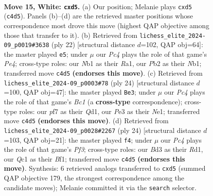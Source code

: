 \documentclass[11pt]{article}
\begin{document}
\clearpage

\begin{figure}[p]\centering
\begin{subfigure}{0.46\textwidth}\centering
\resizebox{\linewidth}{!}{%
\newchessgame
\chessboard[
  setfen={r1bq2k1/p3rppp/4pn2/2pp4/n1P5/3BP1P1/PP3RPP/RNQ1N1K1 w - - 1 15},
  showmover=false,
  pgfstyle=straightmove, color=movearrow, markmove={c4-d5}
]}
\caption{}
\end{subfigure}\hfill
\begin{subfigure}{0.46\textwidth}\centering
\resizebox{\linewidth}{!}{%
\newchessgame
\chessboard[
  setfen={r3kb1r/pp1q1ppp/4pn2/3p4/3PP3/5Q1P/PP3PP1/RNB1R1K1 w kq - 0 12},
  showmover=false,
  pgfstyle=straightmove, color=movearrow, markmove={e4-e5}
]}
\caption{}
\end{subfigure}
\\[4pt]
\begin{subfigure}{0.46\textwidth}\centering
\resizebox{\linewidth}{!}{%
\newchessgame
\chessboard[
  setfen={r3kb1r/pp1q1pp1/2n1p2p/3pP1n1/3P4/2N2P2/PP4PP/R1BQNRK1 w kq - 0 13},
  showmover=false,
  pgfstyle=straightmove, color=movearrow, markmove={c1-e3}
]}
\caption{}
\end{subfigure}\hfill
\begin{subfigure}{0.46\textwidth}\centering
\resizebox{\linewidth}{!}{%
\newchessgame
\chessboard[
  setfen={r1b2rk1/pp3ppp/1qn1p3/2p1n1B1/2P5/P1Q1PP2/1P4PP/3RKBNR w K - 1 13},
  showmover=false,
  pgfstyle=straightmove, color=movearrow, markmove={f3-f4}
]}
\caption{}
\end{subfigure}
\caption{\textbf{Move 15, White: \texttt{cxd5}.} (a) Our position; Melanie plays \texttt{cxd5} (\texttt{c4d5}). Panels (b)--(d) are the retrieved master positions whose correspondence most drove this move (highest QAP objective among those that transfer to it). (b) Retrieved from \texttt{lichess\_elite\_2024-09\_p0019\#3638} (ply 22) [structural distance $d$=102, QAP obj=64]: the master played \texttt{e5}; under $\mu$ our \emph{Pc4} plays the role of that game's \emph{Pe4}; cross-type roles: our \emph{N}b1 as their \emph{R}a1, our \emph{P}b2 as their \emph{N}b1; transferred move \texttt{c4d5} \textbf{(endorses this move)}. (c) Retrieved from \texttt{lichess\_elite\_2024-09\_p0003\#78} (ply 24) [structural distance $d$=100, QAP obj=47]: the master played \texttt{Be3}; under $\mu$ our \emph{Pc4} plays the role of that game's \emph{Bc1} (a \textbf{cross-type} correspondence); cross-type roles: our \emph{p}f7 as their \emph{Q}d1, our \emph{P}e3 as their \emph{N}e1; transferred move \texttt{c4d5} \textbf{(endorses this move)}. (d) Retrieved from \texttt{lichess\_elite\_2024-09\_p0028\#2267} (ply 24) [structural distance $d$=103, QAP obj=21]: the master played \texttt{f4}; under $\mu$ our \emph{Pc4} plays the role of that game's \emph{Pf3}; cross-type roles: our \emph{B}d3 as their \emph{R}d1, our \emph{Q}c1 as their \emph{B}f1; transferred move \texttt{c4d5} \textbf{(endorses this move)}. Synthesis: 6 retrieved analogs transferred to \texttt{cxd5} (summed QAP objective 179, the strongest correspondence among the candidate moves); Melanie committed it via the \texttt{search} selector.}
\label{fig:thought-m28}
\end{figure}
\end{document}
